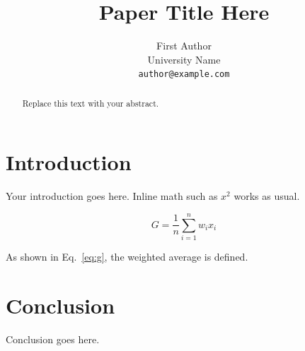 \documentclass{article}
\title{Paper Title Here}
\author{%
  First Author\\
  University Name\\
  \texttt{author@example.com}
}
\begin{document}
\maketitle

\begin{abstract}
Replace this text with your abstract.
\end{abstract}

\section{Introduction}
Your introduction goes here. Inline math such as $x^2$ works as usual.

\begin{equation}
G = \frac{1}{n}\sum_{i=1}^{n} w_i x_i
\label{eq:g}
\end{equation}

As shown in Eq.~\ref{eq:g}, the weighted average is defined.

\section{Conclusion}
Conclusion goes here.


\end{document}
